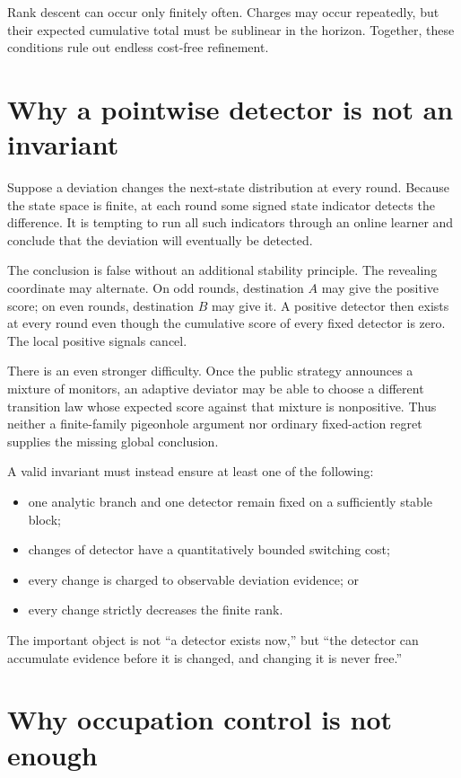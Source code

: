\documentclass[11pt]{article}
\begin{document}
Rank descent can occur only finitely often.  Charges may occur repeatedly,
but their expected cumulative total must be sublinear in the horizon.
Together, these conditions rule out endless cost-free refinement.

\section{Why a pointwise detector is not an invariant}

Suppose a deviation changes the next-state distribution at every round.
Because the state space is finite, at each round some signed state indicator
detects the difference.  It is tempting to run all such indicators through
an online learner and conclude that the deviation will eventually be
detected.

The conclusion is false without an additional stability principle.  The
revealing coordinate may alternate.  On odd rounds, destination \(A\) may
give the positive score; on even rounds, destination \(B\) may give it.  A
positive detector then exists at every round even though the cumulative
score of every fixed detector is zero.  The local positive signals cancel.

There is an even stronger difficulty.  Once the public strategy announces a
mixture of monitors, an adaptive deviator may be able to choose a different
transition law whose expected score against that mixture is nonpositive.
Thus neither a finite-family pigeonhole argument nor ordinary fixed-action
regret supplies the missing global conclusion.

A valid invariant must instead ensure at least one of the following:
\begin{itemize}
  \item one analytic branch and one detector remain fixed on a sufficiently
        stable block;
  \item changes of detector have a quantitatively bounded switching cost;
  \item every change is charged to observable deviation evidence; or
  \item every change strictly decreases the finite rank.
\end{itemize}
The important object is not ``a detector exists now,'' but ``the detector can
accumulate evidence before it is changed, and changing it is never free.''

\section{Why occupation control is not enough}
\end{document}
